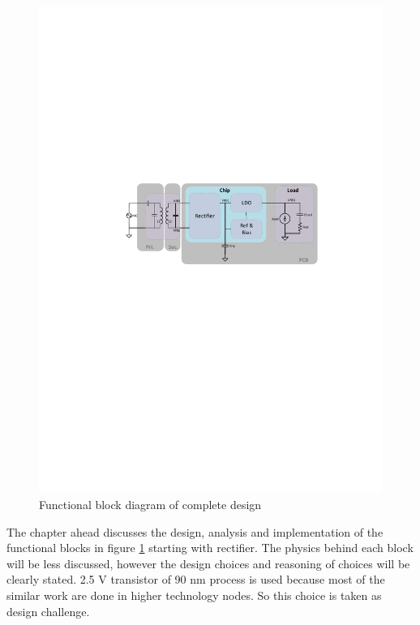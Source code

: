 \documentclass[12pt,a4paper,UKenglish]{report}
\begin{document}
\begin{figure}[!htbp] %
   \centering
   \includegraphics[width=\textwidth]{img/visio_funct_wpt.pdf}
   \caption{Functional block diagram of complete design}
   \label{fig:funct_block}
\end{figure}

The chapter ahead discusses the design, analysis and implementation of the functional blocks in figure 
\ref{fig:funct_block} starting with rectifier. The physics behind each block will be less discussed, however the 
design choices and reasoning of choices will be clearly stated. 2.5 V transistor of 90 nm process is used because most of the similar work are done 
in higher technology nodes. So this choice is taken as design challenge. 


\end{document}
